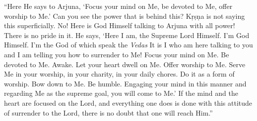 \enquote{Here He says to Arjuna, \enquote{Focus your mind on Me, be devoted to Me, offer worship to Me.} Can you see the power that is behind this? Kṛṣṇa is not saying this superficially. No! Here is God Himself talking to Arjuna with all power! There is no pride in it. He says, \enquote{Here I am, the Supreme Lord Himself. I’m God Himself. I’m the God of which speak the \textit{Vedas} It is I who am here talking to you and I am telling you how to surrender to Me! Focus your mind on Me. Be devoted to Me. Awake. Let your heart dwell on Me. Offer worship to Me. Serve Me in your worship, in your charity, in your daily chores. Do it as a form of worship. Bow down to Me. Be humble. Engaging your mind in this manner and regarding Me as the supreme goal, you will come to Me.} If the mind and the heart are focused on the Lord, and everything one does is done with this attitude of surrender to the Lord, there is no doubt that one will reach Him.}

